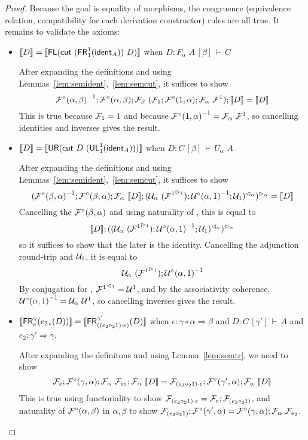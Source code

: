 \documentclass{drl-common/llncs}
\renewcommand{\sem}[1]{\ensuremath{ \llbracket #1 \rrbracket}}
\newcommand{\inv}[1]{\ensuremath{{#1}^{-1}}}
\newcommand{\tc}[2]{\ensuremath{#1 \Rightarrow #2}}
\newcommand\compo[2]{\ensuremath{#1 \circ #2}}
\newcommand\compv[2]{\ensuremath{#1 \cdot #2}}
\newcommand\comph[2]{\ensuremath{#1 \mathbin{\circ_2} #2}}
\newcommand\F[2]{\ensuremath{F_{#1} \,\, #2}}
\newcommand\U[2]{\ensuremath{U_{#1} \,\, #2}}
\newcommand\seq[3]{\ensuremath{#1 \, [ #2 ] \, \vdash \, #3}}
\newcommand\tr[2]{\ensuremath{{{#1}_{*}(#2)}}}
\newcommand\ident[1]{\ensuremath{\dsd{ident}_{#1}}}
\newcommand\cutsym{\ensuremath{\dsd{cut}}}
\newcommand\cut[2]{\ensuremath{{\cutsym \,\, #1 \,\, #2}}}
\newcommand\UL[3]{\ensuremath{\dsd{UL}^{#1}_{#2}(#3)}}
\newcommand\FR[3]{\ensuremath{\dsd{FR}^{#1}_{#2}(#3)}}
\newcommand\FL[1]{\ensuremath{\dsd{FL}(#1)}}
\newcommand\UR[1]{\ensuremath{\dsd{UR}(#1)}}
\begin{document}
\begin{proof}
Because the goal is equality of morphisms, the congruence (equivalence
relation, compatibility for each derivation constructor) rules are all
true.  It remains to validate the axioms:

\begin{itemize}
\item $\sem{D} = \sem{\FL {\cut{(\FR 1 1 {\ident{A}})}{D}} }$
when ${D : \seq{\F \alpha A}{\beta}{C}}$

After expanding the definitions and using
Lemmas~\ref{lem:semident},~\ref{lem:semcut}, it suffices to show
\[
\inv{\semFcomp(\alpha,\beta)};\semFcomp(\alpha,\beta);\semF{\beta}{(\semFo{1};\semFcomp(1,\alpha);\semF{\alpha}{\semFone})};\sem{D}
= \sem{D}
\]
This is true because ${\mathcal{F}_{1}} = 1$ and because
$\inv{\semFcomp(1,\alpha)} = \semF{\alpha}{\semFone}$, so cancelling
identities and inverses gives the result.  

\item $\sem{D} = \sem{\UR {\cut{D}{(\UL 1 1 {\ident{A}})}}}$
when ${D : \seq{C}{\beta}{\U \alpha A}}$

After expanding the definitions and using
Lemmas~\ref{lem:semident},~\ref{lem:semcut}, it suffices to show
\[
\semltor{(\inv{\semFcomp(\beta,\alpha)};\semFcomp(\beta,\alpha);\semF{\alpha}{\sem D};\semrtol{(\semU{\alpha}{(\semltor{\semFone}{1})};\inv{\semUcomp(\alpha,1)};\semUo{1})}{\alpha})}{\alpha}
= \sem{D}
\]
Cancelling the $\mathcal{F}^\circ(\beta,\alpha)$ and using naturality of
\semltor{-}{\alpha}, this is equal to
\[
\sem{D};\semltor{(\semrtol{(\semU{\alpha}{(\semltor{\semFone}{1})};\inv{\semUcomp(\alpha,1)};\semUo{1})}{\alpha})}{\alpha}
\]
so it suffices to show that the later is the identity.  Cancelling the
adjunction round-trip and $\mathcal{U}_{1}$, it is equal to
\[
\semU{\alpha}{(\semltor{\semFone}{1})};\inv{\semUcomp(\alpha,1)}
\]
By conjugation for \semFone, ${\mathcal{F}^1}^{\vartriangleleft_{1}} = {\mathcal{U}^1}$, and by
the associativity coherence, $\inv{\semUcomp(\alpha,1)} =
\semU{\alpha}{\semUone}$, so cancelling inverses gives the result.  

\item $\sem{{\FR{\gamma}{e}{\tr{e_2}{D}}}} = \sem{\FR{\gamma'}{(\compv{(\comph{e_2}{1})}{e})}{D}}$
when $e : \tc{\compo{\gamma}{\alpha}}{\beta}$
and $D : \seq{C}{\gamma'}{A}$
and $e_2 : \tc{\gamma'}{\gamma}$.

After expanding the definitons and using Lemma~\ref{lem:semtr}, we need
to show
\[
\semFo{e};\semFcomp(\gamma,\alpha);\semF{\alpha}{\semFo{e_2}};\semF{\alpha}{\sem{D}}
= \semFo{\compv{(\comph{e_2}{1})}{e}};\semFcomp(\gamma',\alpha);\semF{\alpha}{\sem{D}}
\]
This is true using functoriality to show $\semFo{\compv{(\comph{e_2}{1})}{e}} =
\semFo{e};\semFo{{(\comph{e_2}{1})}}$,
and naturality of $\mathcal{F}^\circ(\alpha,\beta)$ in $\alpha,\beta$ to show
$\semFo{{(\comph{e_2}{1})}};\semFcomp(\gamma',\alpha) =
\semFcomp(\gamma,\alpha);\semF{\alpha}{\semFo{e_2}}$.  
  


\end{itemize}
\end{proof}
\end{document}
